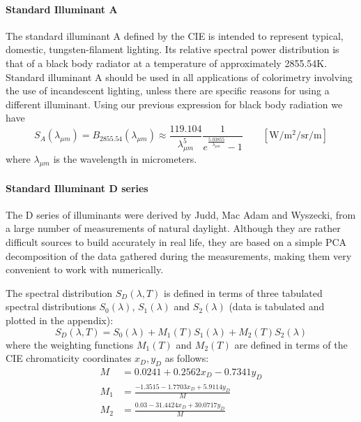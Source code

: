 \paragraph{Standard Illuminant A}

The standard illuminant A defined by the \gls{CIE} is intended to
represent typical, domestic, tungsten-filament lighting.
Its relative spectral power distribution is that of a black body radiator at a
temperature of approximately \num{2855.54}\unit{\kelvin}.
Standard illuminant A should be used in all applications of colorimetry
involving the use of incandescent lighting, unless there are specific reasons
for
using a different illuminant. Using our previous expression for black body radiation we have
\begin{equation}
S_{A}(\lambda_{\mu m}) = B_{2855.54}(\lambda_{\mu m}) \approx
\frac{119.104}{\lambda_{\mu m}^5} \frac 1{e^{\frac{5.03855}{\lambda_{\mu m}}}-1}
\qquad \left[\unit{\watt\per\square\meter\per\steradian\per\meter}\right]
\end{equation}
where $\lambda_{\mu m}$ is the wavelength in micrometers.

\paragraph{Standard Illuminant D series}

The D series of illuminants were derived by Judd, Mac Adam and Wyszecki, from a
large number of measurements of natural daylight. Although they are rather
difficult sources to build accurately in real life, they are based on a simple
PCA decomposition of the data gathered during the measurements, making them
very convenient to work with numerically.

The spectral distribution $S_D(\lambda, T)$ is defined in terms of three tabulated spectral
distributions $S_0(\lambda)$, $S_1(\lambda)$ and $S_2(\lambda)$ (data is tabulated
and plotted in the appendix):
\begin{equation}
S_D(\lambda, T) = S_0(\lambda) + M_1(T) S_1(\lambda) + M_2(T) S_2(\lambda)
\end{equation}
where the weighting functions $M_1(T)$ and $M_2(T)$ are defined in terms of the
\gls{CIE} chromaticity coordinates $x_D, y_D$ as follows:
\begin{align*}
M   &= 0.0241 + 0.2562 x_D - 0.7341 y_D \\
M_1 &= \frac{-1.3515 - 1.7703 x_D + 5.9114 y_D}{M} \\
M_2 &= \frac{0.03 - 31.4424 x_D + 30.0717 y_D}{M} \\
\end{align*}

